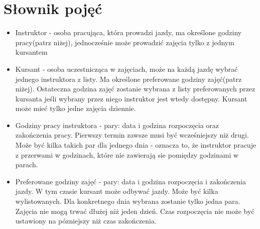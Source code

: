\documentclass{article}
\begin{document}
\section{Słownik pojęć}
\par
\begin{itemize}
	\item Instruktor - osoba pracująca, która prowadzi jazdy, ma określone godziny pracy(patrz niżej), jednocześnie może prowadzić zajęcia tylko z jednym kursantem
	\item Kursant - osoba uczestnicząca w zajęciach, może na każdą jazdę wybrać jednego instruktora z listy. Ma określone preferowane godziny zajęć(patrz niżej). Ostateczna godzina zajęć zostanie wybrana z listy preferowanych przez kursanta jeśli wybrany przez niego instruktor jest wtedy dostępny. Kursant może mieć tylko jedne zajęcia dziennie.  
	\item Godziny pracy instruktora - pary: data i godzina rozpoczęcia oraz zakończenia pracy. Pierwszy termin zawsze musi być wcześniejszy niż drugi. Może być kilka takich par dla jednego dnia - oznacza to, że instruktor pracuje z przerwami w godzinach, które nie zawierają sie pomiędzy godzinami w parach.
	\item Preferowane godziny zajęć - pary: data i godzina rozpoczęcia i zakończenia jazdy. W tym czasie kursant może odbywać jazdy. Może być kilka wylistowanych. Dla konkretnego dnia wybrana zostanie tylko jedna para. Zajęcia nie mogą trwać dłużej niż jeden dzień. Czas rozpoczęcia nie może być ustawiony na pózniejszy niż czas zakończenia.

\end{itemize}
\end{document}
